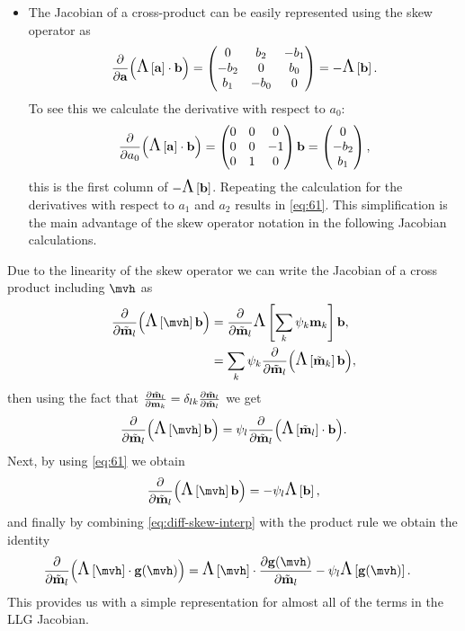 {\begin{itemize}
\item The Jacobian of a cross-product can be easily represented using the skew operator as
  \begin{equation}
    \frac{\partial }{\partial {\boldsymbol{\mathrm{a}}}} {\left(  \text{\Large{$\Lambda$}}\left[ {\boldsymbol{\mathrm{a}}} \right] \cdot {\boldsymbol{\mathrm{b}}}  \right)} = \begin{pmatrix}
      0 & b_2 & -b_1 \\
      -b_2 & 0 & b_0 \\
      b_1 & -b_0 & 0
    \end{pmatrix} = -\text{\Large{$\Lambda$}}\left[ {\boldsymbol{\mathrm{b}}} \right].
    \label{eq:61}
  \end{equation}
  To see this we calculate the derivative with respect to $a_0$:
  \begin{equation}
    \frac{\partial }{\partial a_0} {\left(  \text{\Large{$\Lambda$}}\left[ {\boldsymbol{\mathrm{a}}} \right] \cdot {\boldsymbol{\mathrm{b}}}  \right)} = \begin{pmatrix}
      0 & 0 & 0 \\
      0 & 0 & -1 \\
      0 & 1 & 0
    \end{pmatrix}{\boldsymbol{\mathrm{b}}} = \begin{pmatrix} 0 \\ -b_2 \\ b_1 \end{pmatrix},
  \end{equation}
  this is the first column of $-\text{\Large{$\Lambda$}}\left[ {\boldsymbol{\mathrm{b}}} \right]$.
  Repeating the calculation for the derivatives with respect to $a_1$ and $a_2$ results in \cref{eq:61}.
  This simplification is the main advantage of the skew operator notation in the following Jacobian calculations.
\end{itemize}

Due to the linearity of the skew operator we can write the Jacobian of a cross product including $\mvh$ as
\begin{equation}
  \begin{aligned}
    \pd{}{\mvdis_l} \bigb{\skewm{\mvh} \bv} &= \pd{}{\mvdis_l} \skewm{\intp{\mv}} \bv, \\
    &= \sum_k \sbf_k \pd{}{\mvdis_l} \bigb{\skewm{\mvdis_k} \bv},
  \end{aligned}
\end{equation}
then using the fact that $\frac{\partial \tilde{\boldsymbol{\mathrm{m}}}_l}{\partial \boldsymbol{\mathrm{m}}_{k}} = \delta_{lk} \frac{\partial \tilde{\boldsymbol{\mathrm{m}}}_l}{\partial \tilde{\boldsymbol{\mathrm{m}}}_l}$ we get
\begin{equation}
  \pd{}{\mvdis_l} \bigb{\skewm{\mvh} \bv}  = \sbf_l \pd{}{\mvdis_l} \bigb{\skewm{\mvdis_l} \cdot \bv}.
\end{equation}
Next, by using \cref{eq:61} we obtain
\begin{equation}
  \pd{}{\mvdis_l} \bigb{\skewm{\mvh} \bv} = - \sbf_l\skewm{\bv},
  \label{eq:diff-skew-interp}
\end{equation}
and finally by combining \cref{eq:diff-skew-interp} with the product rule we obtain the identity
\begin{equation}
  \begin{aligned}
    \pd{}{\mvdis_l} \bigb{\skewm{\mvh}\cdot \gv(\mvh)}
    &= \skewm{\mvh}\cdot \pd{\gv(\mvh)}{\mvdis_l} - \sbf_l \skewm{\gv(\mvh)}.
    \label{eq:68}
  \end{aligned}
\end{equation}
This provides us with a simple representation for almost all of the terms in the LLG Jacobian.

}

